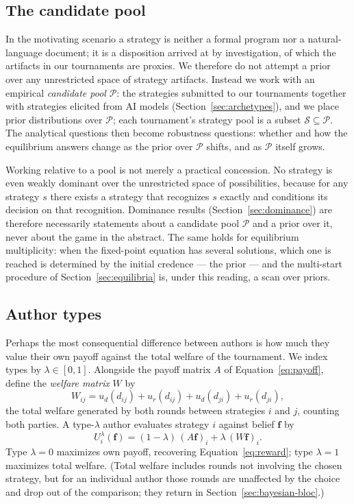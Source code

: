 \subsection{The candidate pool}

In the motivating scenario a strategy is neither a formal program nor a
natural-language document; it is a disposition arrived at by
investigation, of which the artifacts in our tournaments are proxies.
We therefore do not attempt a prior over any unrestricted space of
strategy artifacts.
Instead we work with an empirical \emph{candidate pool}
$\mathcal{P}$: the strategies submitted to our tournaments together
with strategies elicited from AI models
(Section~\ref{sec:archetypes}), and we place prior distributions over
$\mathcal{P}$; each tournament's strategy pool is a subset
$\mathcal{S} \subseteq \mathcal{P}$.
The analytical questions then become robustness questions:
whether and how the equilibrium answers change as the prior over
$\mathcal{P}$ shifts, and as $\mathcal{P}$ itself grows.

Working relative to a pool is not merely a practical concession.
No strategy is even weakly dominant over the unrestricted space of
possibilities, because for any strategy $s$ there exists a strategy
that recognizes $s$ exactly and conditions its decision on that
recognition.
Dominance results (Section~\ref{sec:dominance}) are therefore
necessarily statements about a candidate pool $\mathcal{P}$ and a
prior over it, never about the game in the abstract.
The same holds for equilibrium multiplicity: when the fixed-point
equation has several solutions, which one is reached is determined by
the initial credence --- the prior --- and the multi-start procedure of
Section~\ref{sec:equilibria} is, under this reading, a scan over
priors.

\subsection{Author types}
\label{sec:author-types}

Perhaps the most consequential difference between authors is how much
they value their own payoff against the total welfare of the
tournament.
We index types by $\lambda \in [0, 1]$.
Alongside the payoff matrix $A$ of Equation~\eqref{eq:payoff}, define
the \emph{welfare matrix} $W$ by
\begin{equation}
  W_{ij} = u_d(d_{ij}) + u_r(d_{ij}) + u_d(d_{ji}) + u_r(d_{ji}),
  \label{eq:welfare-matrix}
\end{equation}
the total welfare generated by both rounds between strategies $i$ and
$j$, counting both parties.
A type-$\lambda$ author evaluates strategy $i$ against belief
$\mathbf{f}$ by
\begin{equation}
  U^\lambda_i(\mathbf{f})
  = (1 - \lambda)\, (A\mathbf{f})_i + \lambda\, (W\mathbf{f})_i .
  \label{eq:type-utility}
\end{equation}
Type $\lambda = 0$ maximizes own payoff, recovering
Equation~\eqref{eq:reward}; type $\lambda = 1$ maximizes total
welfare.
(Total welfare includes rounds not involving the chosen strategy, but
for an individual author those rounds are unaffected by the choice and
drop out of the comparison; they return in
Section~\ref{sec:bayesian-bloc}.)

